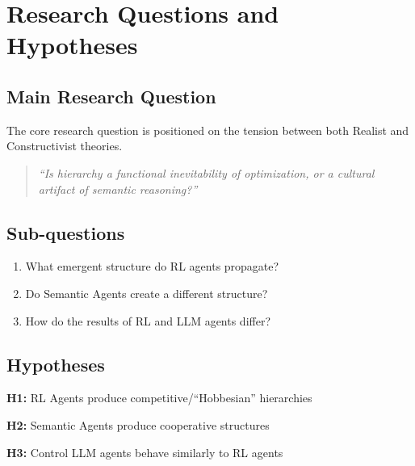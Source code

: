 \section{Research Questions and Hypotheses}

\subsection{Main Research Question}

The core research question is positioned on the tension between both Realist and Constructivist theories.

\begin{quote}
\textit{``Is hierarchy a functional inevitability of optimization, or a cultural artifact of semantic reasoning?''}
\end{quote}


\subsection{Sub-questions}

\begin{enumerate}
    \item What emergent structure do RL agents propagate?
    \item Do Semantic Agents create a different structure?
    \item How do the results of RL and LLM agents differ?
\end{enumerate}

\subsection{Hypotheses}

\textbf{H1:} RL Agents produce competitive/``Hobbesian'' hierarchies

\textbf{H2:} Semantic Agents produce cooperative structures

\textbf{H3:} Control LLM agents behave similarly to RL agents

